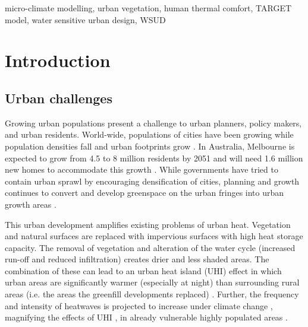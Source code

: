 \documentclass[final,3p,times,authoryear]{elsarticle}
\begin{document}
\begin{frontmatter}
\begin{abstract}
\end{abstract}

\begin{keyword}
micro-climate modelling, urban vegetation, human thermal comfort, TARGET model, water sensitive urban design, WSUD



\end{keyword}

\end{frontmatter}







\section{Introduction}\label{sec:introduction}
\subsection{Urban challenges}

Growing urban populations present a challenge to urban planners, policy makers, and urban residents. World-wide, populations of cities have been growing while population densities fall and urban footprints grow \citep{Roberts2007}. In Australia, Melbourne is expected to grow from 4.5 to 8 million residents by 2051 and will need 1.6 million new homes to accommodate this growth \citep{VictoriaStateGovernment2017}. While governments have tried to contain urban sprawl by encouraging densification of cities, planning and growth continues to convert and develop greenspace on the urban fringes into urban growth areas \citep{GrowthAreasAuthority2009}.

This urban development amplifies existing problems of urban heat. Vegetation and natural surfaces are replaced with impervious surfaces with high heat storage capacity. The removal of vegetation and alteration of the water cycle (increased run-off and reduced infiltration) creates drier and less shaded areas. The combination of these can lead to an urban heat island (UHI) effect in which urban areas are significantly warmer (especially at night) than surrounding rural areas (i.e. the areas the greenfill developments replaced) \citep{Coutts2010,Oke1982}. Further, the frequency and intensity of heatwaves is projected to increase under climate change \citep{Alexander2009}, magnifying the effects of UHI \citep{Rogers2018}, in already vulnerable highly populated areas \citep{Lemonsu2015}.
\end{document}
